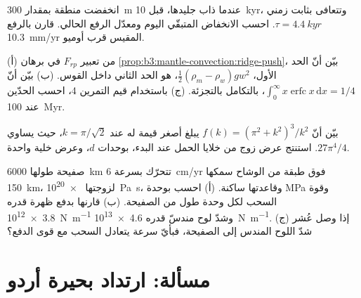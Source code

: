 \begin{exercise}[$\star\star$]\label{exo:b3:mantle-convection:9}
انخفضت منطقة بمقدار \qty{300}{m} عندما ذاب جليدها، قبل \qty{10}{kyr}،
وتتعافى بثابت زمني $\tau = \qty{4.4}{kyr}$. احسب الانخفاض المتبقّي اليوم
ومعدّل الرفع الحالي. قارن بالرفع \qty{10.3}{mm/yr} المقيس قرب
أوميو.
\end{exercise}

\begin{exercise}[$\star\star\star$]\label{exo:b3:mantle-convection:10}
(أ) من تعبير $F_{rp}$ في برهان
\cref{prop:b3:mantle-convection:ridge-push}، بيّن أنّ الحد الأول،
$\tfrac12(\rho_m - \rho_w)gw^2$، هو الحد الثاني داخل القوس. (ب) بيّن أنّ
$\int_0^\infty x\operatorname{erfc}x\,\mathrm dx = 1/4$، بالتكامل بالتجزئة.
(ج) باستخدام قيم التمرين 4، احسب الحدّين عند \qty{100}{Myr}.
\end{exercise}

\begin{exercise}[$\star\star\star$]\label{exo:b3:mantle-convection:11}
بيّن أنّ $f(k) = (\pi^2 + k^2)^3/k^2$ يبلغ أصغر قيمة له عند $k = \pi/\sqrt2$، حيث
يساوي $27\pi^4/4$. استنتج عرض زوج من خلايا الحمل عند البدء،
بوحدات $d$، وعرض خلية واحدة.
\end{exercise}

\begin{exercise}[$\star\star\star$]\label{exo:b3:mantle-convection:12}
صفيحة طولها \qty{6000}{km} تتحرّك بسرعة \qty{6}{cm/yr} فوق طبقة من الوشاح
سمكها \qty{150}{km}، لزوجتها \qty{e20}{Pa.s}، وقاعدتها ساكنة. (أ)
احسب  بوحدة \unit{MPa} وقوة السحب لكل وحدة طول من الصفيحة.
(ب) قارنها بدفع ظهرة قدره \qty{3.8e12}{N.m^{-1}} وشدّ لوح مندسّ قدره
\qty{4.6e13}{N.m^{-1}}. (ج) إذا وصل عُشر شدّ اللوح المندس إلى الصفيحة،
فبأيّ سرعة يتعادل السحب مع قوى الدفع؟
\end{exercise}

\section{مسألة: ارتداد بحيرة أردو}

